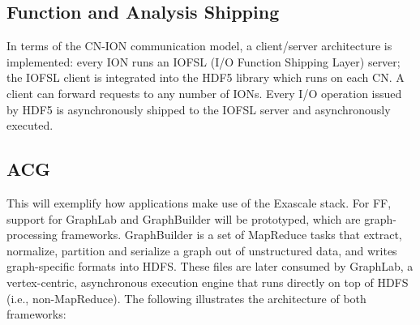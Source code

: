 \documentclass[conference]{IEEEtran}
\newcommand{\DDTns}{D\textsuperscript{2}T}
\begin{document}
%

\subsection{Function and Analysis Shipping}
\label{sec:fn-shipping}

In terms of the CN-ION communication model, a client/server architecture
is implemented: every ION runs an IOFSL (I/O Function Shipping
Layer) server; the IOFSL client is integrated into the HDF5
library which runs on each CN. A client can forward requests to any
number of IONs. Every I/O operation issued by HDF5 is asynchronously
shipped to the IOFSL server and asynchronously executed.

\subsection{ACG}
\label{sec:acg}

This will exemplify how applications make use of the Exascale stack. For FF,
support for GraphLab and GraphBuilder will be prototyped, which are
graph-processing frameworks. GraphBuilder is a set of MapReduce tasks that
extract, normalize, partition and serialize a graph out of unstructured data,
and writes graph-specific formats into HDFS. These files are later consumed by
GraphLab, a vertex-centric, asynchronous execution engine that runs directly on
top of HDFS (i.e., non-MapReduce). The following illustrates the architecture
of both frameworks:
\end{document}
